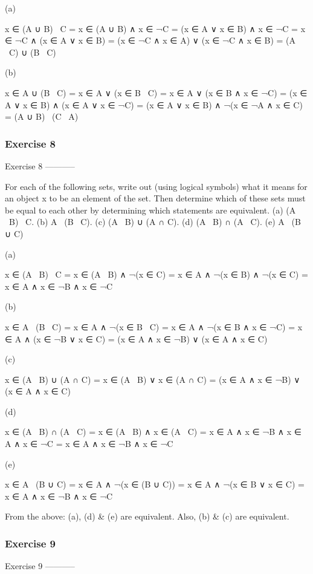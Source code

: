 (a)

    x ∈ (A ∪ B) \ C
    = x ∈ (A ∪ B) ∧ x ∈ ¬C
    = (x ∈ A ∨ x ∈ B) ∧ x ∈ ¬C
    = x ∈ ¬C ∧ (x ∈ A ∨ x ∈ B)
    = (x ∈ ¬C ∧ x ∈ A) ∨ (x ∈ ¬C ∧ x ∈ B)
    = (A \ C) ∪ (B \ C)

(b)

    x ∈ A ∪ (B \ C)
    = x ∈ A ∨ (x ∈ B \ C)
    = x ∈ A ∨ (x ∈ B ∧ x ∈ ¬C)
    = (x ∈ A ∨ x ∈ B) ∧ (x ∈ A ∨ x ∈ ¬C)
    = (x ∈ A ∨ x ∈ B) ∧ ¬(x ∈ ¬A ∧ x ∈ C)
    = (A ∪ B) \ (C \ A)

\subsubsection{Exercise 8}
Exercise 8
-----------

    For each of the following sets, write out (using logical symbols) what it
    means for an object x to be an element of the set. Then determine which
    of these sets must be equal to each other by determining which statements
    are equivalent.
    (a) (A \ B) \ C.
    (b) A \ (B \ C).
    (c) (A \ B) ∪ (A ∩ C).
    (d) (A \ B) ∩ (A \ C).
    (e) A \ (B ∪ C)

(a)

    x ∈ (A \ B) \ C
    = x ∈ (A \ B) ∧ ¬(x ∈ C)
    = x ∈ A ∧ ¬(x ∈ B) ∧ ¬(x ∈ C)
    = x ∈ A ∧ x ∈ ¬B ∧ x ∈ ¬C

(b)

    x ∈ A \ (B \ C)
    = x ∈ A ∧ ¬(x ∈ B \ C)
    = x ∈ A ∧ ¬(x ∈ B ∧ x ∈ ¬C)
    = x ∈ A ∧ (x ∈ ¬B ∨ x ∈ C)
    = (x ∈ A ∧ x ∈ ¬B) ∨ (x ∈ A ∧ x ∈ C)

(c)

    x ∈ (A \ B) ∪ (A ∩ C)
    = x ∈ (A \ B) ∨ x ∈ (A ∩ C)
    = (x ∈ A ∧ x ∈ ¬B) ∨ (x ∈ A ∧ x ∈ C)

(d)

    x ∈ (A \ B) ∩ (A \ C)
    = x ∈ (A \ B) ∧ x ∈ (A \ C)
    = x ∈ A ∧ x ∈ ¬B ∧ x ∈ A ∧ x ∈ ¬C
    = x ∈ A ∧ x ∈ ¬B ∧ x ∈ ¬C

(e)

    x ∈ A \ (B ∪ C)
    = x ∈ A ∧ ¬(x ∈ (B ∪ C))
    = x ∈ A ∧ ¬(x ∈ B ∨ x ∈ C)
    = x ∈ A ∧ x ∈ ¬B ∧ x ∈ ¬C

From the above: (a), (d) & (e) are equivalent. Also, (b) & (c) are
equivalent.

\subsubsection{Exercise 9}
Exercise 9
-----------

